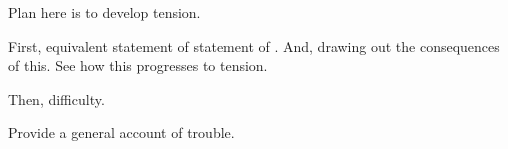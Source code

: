\begin{note}
  Plan here is to develop tension.

  First, equivalent statement of statement of \zSN{}.
  And, drawing out the consequences of this.
  See how this progresses to tension.

  Then, difficulty.

  Provide a general account of trouble.
\end{note}
